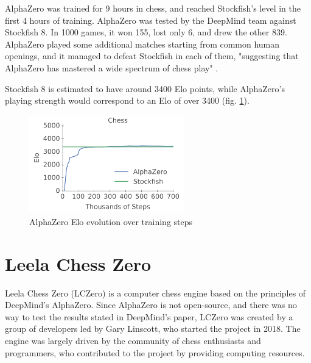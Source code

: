 AlphaZero was trained for 9 hours in chess, and reached Stockfish's level in the first 4 hours of training. AlphaZero was tested by the DeepMind team against Stockfish 8. In 1000 games, it won 155, lost only 6, and drew the other 839. AlphaZero played some additional matches starting from common human openings, and it managed to defeat Stockfish in each of them, "suggesting that AlphaZero has mastered a wide spectrum of chess play" \cite{silver2018general}.

Stockfish 8 is estimated to have around 3400 Elo points, while AlphaZero's playing strength would correspond to an Elo of over 3400 (fig. \ref{fig:alphaZeroEloEvolution}).

\begin{figure}[h]
    \centering
    \includegraphics[width=0.6\textwidth]{figures/alpha-zero-elo-evolution.png}
    \caption{AlphaZero Elo evolution over training steps \cite{silver2018general}}
    \label{fig:alphaZeroEloEvolution}
\end{figure}

\section{Leela Chess Zero}
\label{sec:ch3sec5}

Leela Chess Zero (LCZero) is a computer chess engine based on the principles of DeepMind's AlphaZero. Since AlphaZero is not open-source, and there was no way to test the results stated in DeepMind's paper, LCZero was created by a group of developers led by Gary Linscott, who started the project in 2018. The engine was largely driven by the community of chess enthusiasts and programmers, who contributed to the project by providing computing resources.

